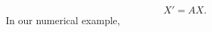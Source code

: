 \documentclass{article}
\newcommand{\ta}{\mathtt{a}}
\newcommand{\tb}{\mathtt{b}}
\newcommand{\tE}{\mathtt{E}}
\newcommand{\tP}{\mathtt{P}}
\begin{document}
\begin{displaymath}
  X' = A X. 
\end{displaymath}
In our numerical example,
\end{document}
